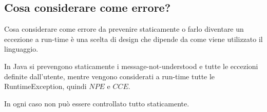 \subsection{Cosa considerare come errore?}

Cosa considerare come errore da prevenire staticamente o farlo diventare un eccezione a run-time è una scelta di design che dipende da come viene utilizzato il linguaggio.

In Java si prevengono staticamente i message-not-understood e tutte le eccezioni definite dall'utente, mentre vengono considerati a run-time tutte le RuntimeException, quindi $NPE$ e $CCE$.

In ogni caso non può essere controllato tutto staticamente.























